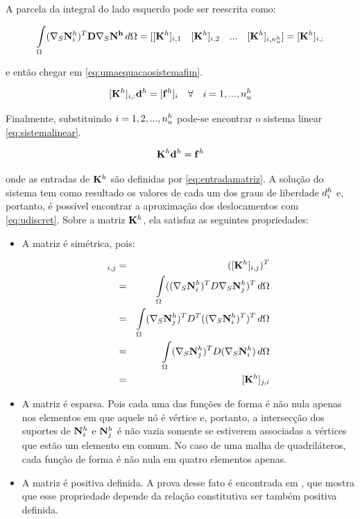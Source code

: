 A parcela da integral do lado esquerdo pode ser reescrita como:

\begin{equation}
\omeint{(\sopnabla \basefunctionfine)^T \mathbf{D} \sopnabla \mathbf{N^h} }= [ [\rigidmatrix]_{i,1}\quad   [\rigidmatrix]_{i,2} \quad ... \quad  [\rigidmatrix]_{i,\qtdfreedomfine}] =  [\rigidmatrix]_{i,:}
\end{equation}

e então chegar em \eqref{eq:umaequacaosistemafim}.

\begin{equation} \label{eq:umaequacaosistemafim}
[\rigidmatrix]_{i,:} \mathbf{d}^h = [\mathbf{f}^h]_i \quad \forall \quad i=1,..., \qtdfreedomfine
\end{equation}

Finalmente, substituindo  $i = 1, 2, ..., \qtdfreedomfine$ pode-se encontrar o sistema linear \eqref{eq:sistemalinear}.

\begin{equation}\label{eq:sistemalinear}
    \rigidmatrix \mathbf{d}^h = \mathbf{f}^h
\end{equation}



onde as entradas de $\rigidmatrix $ são definidas por \eqref{eq:entradamatriz}. A solução do sistema tem como resultado os valores de cada um dos graus de liberdade $\freedomfine$ e, portanto, é possível encontrar a aproximação dos deslocamentos com \eqref{eq:udiscret}. Sobre a matriz $\rigidmatrix$, ela satisfaz as seguintes propriedades:


\begin{itemize}
    \item A matriz é simétrica, pois:

    \begin{eqnarray}
    [\rigidmatrix]_{i,j} & = & ([\rigidmatrix]_{i,j})^T \\
            & = & \omeint{((\sopnabla \basefunctionfine)^T D \sopnabla \basefunctionfine[j])^T} \\
            & = & \omeint{ ( \sopnabla \basefunctionfine[j])^T D^T  ((\sopnabla \basefunctionfine)^T)^T}\\
            & = & \omeint{ ( \sopnabla \basefunctionfine[j])^T D  (\sopnabla \basefunctionfine)} \\
            & = & [\rigidmatrix]_{j,i}
    \end{eqnarray}


    \item A matriz é esparsa. Pois cada uma das funções de forma é não nula apenas nos elementos em que aquele nó é vértice e, portanto, a intersecção dos suportes de $\basefunctionfine$ e $\basefunctionfine[j]$ é não vazia somente se estiverem associadas a vértices que estão um elemento em comum. No caso de uma malha de quadriláteros, cada função de forma é não nula em quatro elementos apenas.

    \item A matriz é positiva definida. A prova desse fato é encontrada em \cite{hughes}, que mostra que esse propriedade depende da relação constitutiva ser também positiva definida.
\end{itemize}



